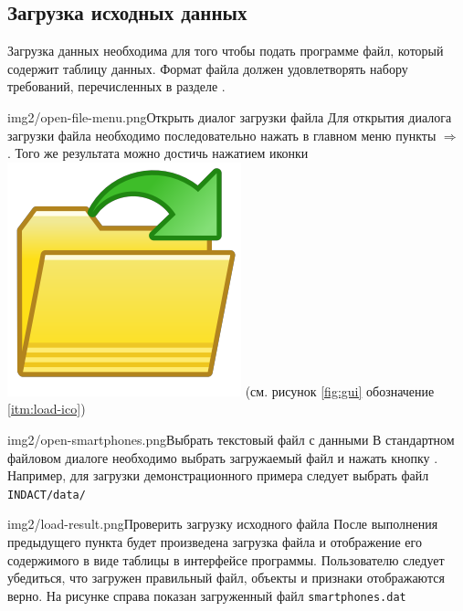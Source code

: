 \documentclass[12pt,tikz]{instruction}
\begin{document}
\newpage
\subsection{Загрузка исходных данных}
\label{subsec:dataload}

Загрузка данных необходима для того чтобы подать программе файл, который содержит таблицу данных. Формат файла должен удовлетворять набору требований, перечисленных в разделе . 

\begin{steps}
	\begin{ist}{img2/open-file-menu.png}{Открыть диалог загрузки файла}
		Для открытия диалога загрузки файла необходимо последовательно нажать в главном меню пункты  $ \Rightarrow $ . Того же результата можно достичь нажатием иконки \includegraphics[scale=0.05]{img2/folder-ico.png} (см. рисунок \ref{fig:gui} обозначение \ref{itm:load-ico})
	\end{ist}
	
	\begin{ist}{img2/open-smartphones.png}{Выбрать текстовый файл с данными}
		В стандартном файловом диалоге необходимо выбрать загружаемый файл и нажать кнопку . Например, для загрузки демонстрационного примера следует выбрать файл \texttt{INDACT/data/} \SampleFile 
	\end{ist}
	\begin{ist}{img2/load-result.png}{Проверить загрузку исходного файла}
		После выполнения предыдущего пункта будет произведена загрузка файла и отображение его содержимого в виде таблицы в интерфейсе программы. Пользователю следует убедиться, что загружен правильный файл, объекты и признаки отображаются верно. На рисунке справа показан загруженный файл \texttt{smartphones.dat} 
	\end{ist}
\end{steps}
\end{document}

